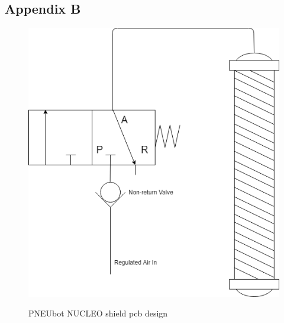 \documentclass[11pt,a4paper]{article}
\begin{document}
\subsection{Appendix B}
\label{sub:shield_design}
\begin{figure}[hbt!]
    \centering
    \caption{PNEUbot NUCLEO shield pcb design}
    \includegraphics[scale=0.3]{Pneumatic_Design.png}
    \label{fig:shield}
\end{figure}

\newpage

\printbibliography
\end{document}
